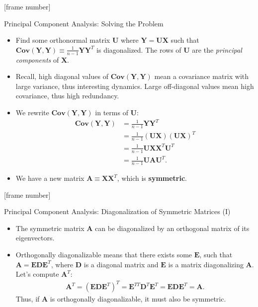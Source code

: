 \documentclass[aspectratio=169,t]{beamer}
\begin{document}
  {
    [frame number]
    \begin{frame}{Principal Component Analysis: Solving the Problem}
    \begin{itemize}
      \item Find some orthonormal matrix $\mathbf{U}$ where $\mathbf{Y}=\mathbf{U}\mathbf{X}$ such that $\mathbf{Cov}(\mathbf{Y},\mathbf{Y}) \equiv \frac{1}{n-1} \mathbf{Y}\mathbf{Y}^T$ is diagonalized. The rows of $\mathbf{U}$ are the \emph{principal components} of $\mathbf{X}$.
      \item Recall, high diagonal values of $\mathbf{Cov}(\mathbf{Y},\mathbf{Y})$ mean a covariance matrix with large variance, thus interesting dynamics. Large off-diagonal values mean high covariance, thus high redundancy.
      \item We rewrite $\mathbf{Cov}(\mathbf{Y},\mathbf{Y})$ in terms of $\mathbf{U}$:
      \begin{align}
        \mathbf{Cov}(\mathbf{Y},\mathbf{Y}) &= \frac{1}{n-1} \mathbf{Y}\mathbf{Y}^T \\
        &= \frac{1}{n-1} (\mathbf{U}\mathbf{X})(\mathbf{U}\mathbf{X})^T \\
        &= \frac{1}{n-1} \mathbf{U}\mathbf{X}\mathbf{X}^T\mathbf{U}^T \\
        &= \frac{1}{n-1} \mathbf{U}\mathbf{A}\mathbf{U}^T.
      \end{align}
      \item We have a new matrix $\mathbf{A} \equiv \mathbf{X}\mathbf{X}^T$, which is \textbf{symmetric}.
    \end{itemize}
    \end{frame}
  }

  {
    [frame number]
    \begin{frame}{Principal Component Analysis: Diagonalization of Symmetric Matrices (I)}
    \begin{itemize}
      \item The symmetric matrix $\mathbf{A}$ can be diagonalized by an orthogonal matrix of its eigenvectors.
      \item Orthogonally diagonalizable means that there exists some $\mathbf{E}$, such that $\mathbf{A} = \mathbf{E}\mathbf{D}\mathbf{E}^T$, where $\mathbf{D}$ is a diagonal matrix and $\mathbf{E}$ is a matrix diagonalizing $\mathbf{A}$. Let's compute $\mathbf{A}^T$:
      \begin{align}
        \mathbf{A}^T = (\mathbf{E}\mathbf{D}\mathbf{E}^T)^T = \mathbf{E}^{TT}\mathbf{D}^T\mathbf{E}^T = \mathbf{EDE}^T = \mathbf{A}.
      \end{align}
      Thus, if $\mathbf{A}$ is orthogonally diagonalizable, it must also be symmetric.
    \end{itemize}
    \end{frame}
  }
\end{document}
